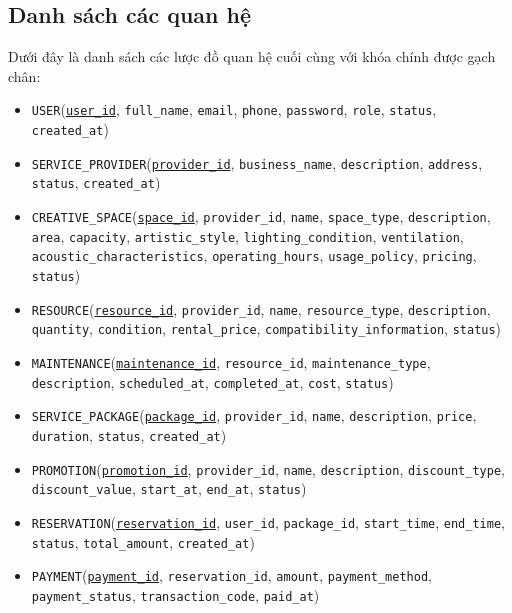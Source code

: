 \subsection{Danh sách các quan hệ}
Dưới đây là danh sách các lược đồ quan hệ cuối cùng với khóa chính được gạch chân:
\begin{itemize}
    \item \texttt{USER}(\underline{\texttt{user\_id}}, \texttt{full\_name}, \texttt{email}, \texttt{phone}, \texttt{password}, \texttt{role}, \texttt{status}, \texttt{created\_at})
    \item \texttt{SERVICE\_PROVIDER}(\underline{\texttt{provider\_id}}, \texttt{business\_name}, \texttt{description}, \texttt{address}, \texttt{status}, \texttt{created\_at})
    \item \texttt{CREATIVE\_SPACE}(\underline{\texttt{space\_id}}, \texttt{provider\_id}, \texttt{name}, \texttt{space\_type}, \texttt{description}, \texttt{area}, \texttt{capacity}, \texttt{artistic\_style}, \texttt{lighting\_condition}, \texttt{ventilation}, \texttt{acoustic\_characteristics}, \texttt{operating\_hours}, \texttt{usage\_policy}, \texttt{pricing}, \texttt{status})
    \item \texttt{RESOURCE}(\underline{\texttt{resource\_id}}, \texttt{provider\_id}, \texttt{name}, \texttt{resource\_type}, \texttt{description}, \texttt{quantity}, \texttt{condition}, \texttt{rental\_price}, \texttt{compatibility\_information}, \texttt{status})
    \item \texttt{MAINTENANCE}(\underline{\texttt{maintenance\_id}}, \texttt{resource\_id}, \texttt{maintenance\_type}, \texttt{description}, \texttt{scheduled\_at}, \texttt{completed\_at}, \texttt{cost}, \texttt{status})
    \item \texttt{SERVICE\_PACKAGE}(\underline{\texttt{package\_id}}, \texttt{provider\_id}, \texttt{name}, \texttt{description}, \texttt{price}, \texttt{duration}, \texttt{status}, \texttt{created\_at})
    \item \texttt{PROMOTION}(\underline{\texttt{promotion\_id}}, \texttt{provider\_id}, \texttt{name}, \texttt{description}, \texttt{discount\_type}, \texttt{discount\_value}, \texttt{start\_at}, \texttt{end\_at}, \texttt{status})
    \item \texttt{RESERVATION}(\underline{\texttt{reservation\_id}}, \texttt{user\_id}, \texttt{package\_id}, \texttt{start\_time}, \texttt{end\_time}, \texttt{status}, \texttt{total\_amount}, \texttt{created\_at})
    \item \texttt{PAYMENT}(\underline{\texttt{payment\_id}}, \texttt{reservation\_id}, \texttt{amount}, \texttt{payment\_method}, \texttt{payment\_status}, \texttt{transaction\_code}, \texttt{paid\_at})

\end{itemize}
